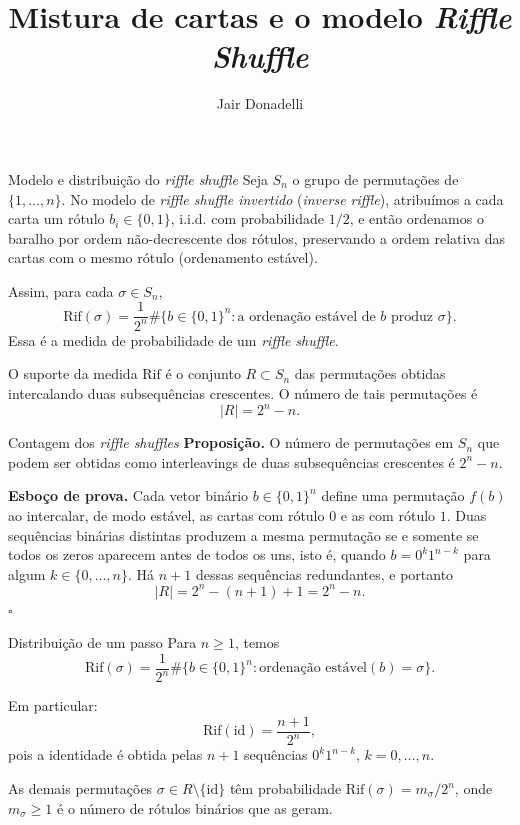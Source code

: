 \documentclass[10pt]{beamer}
\title[Riffle Shuffle]{Mistura de cartas e o modelo \emph{Riffle Shuffle}}
\author{Jair Donadelli}
\institute{Universidade Federal}
\date{}
\newcommand{\Rif}{\mathrm{Rif}}
\begin{document}
\begin{frame}
  \titlepage
\end{frame}

\begin{frame}{Modelo e distribuição do \emph{riffle shuffle}}
  Seja \(S_n\) o grupo de permutações de \(\{1,\dots,n\}\). 
  No modelo de \emph{riffle shuffle invertido} (\emph{inverse riffle}), 
  atribuímos a cada carta um rótulo \(b_i\in\{0,1\}\), i.i.d. com probabilidade \(1/2\),
  e então ordenamos o baralho por ordem não-decrescente dos rótulos, 
  preservando a ordem relativa das cartas com o mesmo rótulo (ordenamento estável).

  Assim, para cada \(\sigma\in S_n\),
  \[
    \Rif(\sigma) 
    = \frac{1}{2^n}\#\bigl\{ b\in\{0,1\}^n : 
      \text{a ordenação estável de }b\text{ produz }\sigma \bigr\}.
  \]
  Essa é a medida de probabilidade de um \emph{riffle shuffle}.

  \vspace{0.5em}
  O suporte da medida \(\Rif\) é o conjunto \(R\subset S_n\) das permutações
  obtidas intercalando duas subsequências crescentes.
  O número de tais permutações é
  \[
    |R| = 2^n - n.
  \]
\end{frame}

\begin{frame}{Contagem dos \emph{riffle shuffles}}
  \textbf{Proposição.} 
  O número de permutações em \(S_n\) que podem ser obtidas
  como interleavings de duas subsequências crescentes é \(2^n - n\).

  \vspace{0.5em}
  \textbf{Esboço de prova.} 
  Cada vetor binário \(b\in\{0,1\}^n\) define uma permutação \(f(b)\)
  ao intercalar, de modo estável, as cartas com rótulo \(0\) e as com rótulo \(1\).
  Duas sequências binárias distintas produzem a mesma permutação
  se e somente se todos os zeros aparecem antes de todos os uns,
  isto é, quando \(b=0^k1^{n-k}\) para algum \(k\in\{0,\dots,n\}\).
  Há \(n+1\) dessas sequências redundantes,
  e portanto
  \[
    |R| = 2^n - (n+1) + 1 = 2^n - n.
  \]
  \(\square\)
\end{frame}

\begin{frame}{Distribuição de um passo}
  Para \(n\ge1\), temos
  \[
    \Rif(\sigma)
    = \frac{1}{2^n}\#\{b\in\{0,1\}^n : \text{ordenação estável}(b)=\sigma\}.
  \]

  Em particular:
  \[
    \Rif(\mathrm{id}) = \frac{n+1}{2^n},
  \]
  pois a identidade é obtida pelas \(n+1\) sequências \(0^k1^{n-k}\),
  \(k=0,\dots,n\).
  
  \vspace{0.5em}
  As demais permutações \(\sigma\in R\setminus\{\mathrm{id}\}\)
  têm probabilidade \(\Rif(\sigma) = m_\sigma/2^n\),
  onde \(m_\sigma\ge1\) é o número de rótulos binários que as geram.
\end{frame}
\end{document}
